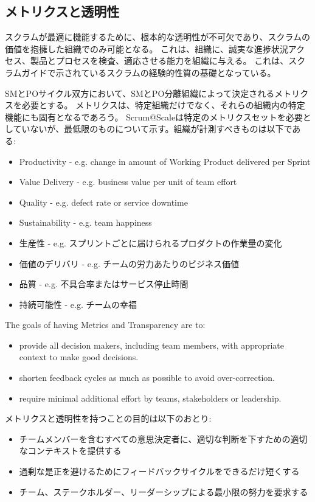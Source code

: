 \documentclass[12pt,a4paper,parskip=full]{scrartcl}
\begin{document}
\subsection{メトリクスと透明性}
スクラムが最適に機能するために、根本的な透明性が不可欠であり、スクラムの価値を抱擁した組織でのみ可能となる。
これは、組織に、誠実な進捗状況アクセス、製品とプロセスを検査、適応させる能力を組織に与える。
これは、スクラムガイドで示されているスクラムの経験的性質の基礎となっている。

SMとPOサイクル双方において、SMとPO分離組織によって決定されるメトリクスを必要とする。
メトリクスは、特定組織だけでなく、それらの組織内の特定機能にも固有となるであろう。
Scrum@Scaleは特定のメトリクスセットを必要としていないが、最低限のものについて示す。組織が計測すべきものは以下である:
\begin{itemize}
\item Productivity - e.g. change in amount of Working Product delivered per
Sprint
\item Value Delivery - e.g. business value per unit of team effort
\item Quality - e.g. defect rate or service downtime
\item Sustainability - e.g. team happiness
\end{itemize}
\fi
\begin{itemize}
\item 生産性 - e.g. スプリントごとに届けられるプロダクトの作業量の変化
\item 価値のデリバリ - e.g. チームの労力あたりのビジネス価値
\item 品質 - e.g. 不具合率またはサービス停止時間
\item 持続可能性 - e.g. チームの幸福
\end{itemize}
The goals of having Metrics and Transparency are to:
\begin{itemize}
  \item provide all decision makers, including team members, with
appropriate context to make good decisions.
\item shorten feedback cycles as much as possible to avoid over-correction.
\item require minimal additional effort by teams, stakeholders or
leadership.
 \end{itemize}
\fi
メトリクスと透明性を持つことの目的は以下のおとり:
\begin{itemize}
  \item チームメンバーを含むすべての意思決定者に、適切な判断を下すための適切なコンテキストを提供する
\item 過剰な是正を避けるためにフィードバックサイクルをできるだけ短くする
\item チーム、ステークホルダー、リーダーシップによる最小限の努力を要求する
 \end{itemize}
\end{document}
